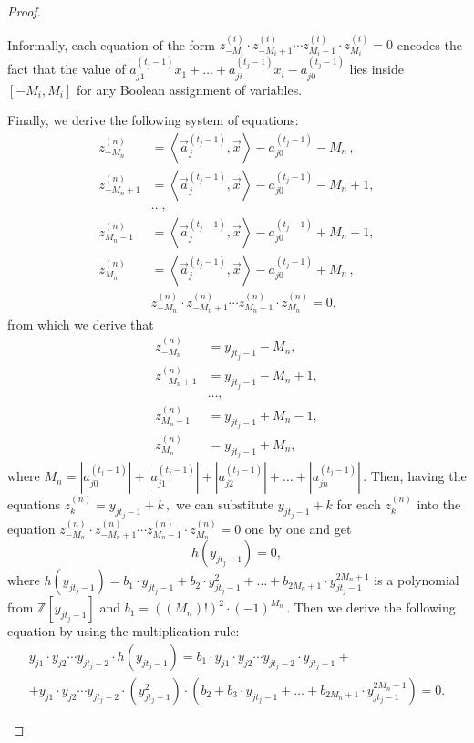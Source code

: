 \documentclass[11pt]{article}
\newcommand{\Z}{{\mathbb Z}}
\begin{document}
\begin{proof}
\begin{itemize}
Informally, each equation of the form $z_{-M_i}^{(i)} \cdot z_{-M_i + 1}^{(i)}  \cdots z_{M_i - 1}^{(i)} \cdot z_{M_i}^{(i)} = 0$ encodes the fact that the value of $a_{j 1}^{(t_j - 1)}x_1  + \ldots + a_{j i}^{(t_j - 1)}x_i - a_{j 0}^{(t_j - 1)}$ lies inside $[-M_i, M_i]$ for any Boolean assignment of variables.

Finally, we derive the following system of equations:
\begin{align*}
%
%
z_{-M_n}^{(n)} &= \left\langle \vec a_j^{(t_j - 1)}, \vec x \right \rangle - a_{j 0}^{(t_j - 1)} - M_n\,, \\
z_{-M_n + 1}^{(n)} &=\left\langle \vec a_j^{(t_j - 1)}, \vec x \right \rangle - a_{j 0}^{(t_j - 1)} - M_n + 1, \\
&\ldots, \\
z_{M_n - 1}^{(n)} &= \left\langle \vec a_j^{(t_j - 1)}, \vec x \right \rangle - a_{j 0}^{(t_j - 1)} + M_n - 1, \\
z_{M_n}^{(n)} &= \left\langle \vec a_j^{(t_j - 1)}, \vec x \right \rangle - a_{j 0}^{(t_j - 1)} + M_n\,, \\
&z_{-M_n}^{(n)} \cdot z_{-M_n + 1}^{(n)}  \cdots z_{M_n - 1}^{(n)} \cdot z_{M_n}^{(n)} = 0,
\end{align*}
from which we derive that
\begin{align*}
%
z_{-M_n}^{(n)} &= y_{j t_j - 1} - M_n, \\  z_{-M_n + 1}^{(n)} &= y_{j t_j - 1} - M_n + 1,  \\ &\ldots, \\ z_{M_n - 1}^{(n)} &= y_{j t_j - 1} + M_n - 1, \\ z_{M_n}^{(n)} &=  y_{j t_j - 1} + M_n, %
\end{align*}
%
where %
$M_n = |a_{j 0}^{(t_j - 1)}| + |a_{j 1}^{(t_j - 1)}| + |a_{j 2}^{(t_j - 1)}| + \ldots + |a_{j n}^{(t_j - 1)}|\,.$ %
 Then, having the equations %
$z_{k}^{(n)} = y_{j t_j - 1} + k\,,$ %
 we can substitute $y_{j t_j - 1} + k$ for each $z_{k}^{(n)}$ into the equation $z_{-M_n}^{(n)} \cdot z_{-M_n + 1}^{(n)}  \cdots z_{M_n - 1}^{(n)} \cdot z_{M_n}^{(n)} = 0$ one by one and get %
    $$
    h(y_{j t_j - 1}) = 0, %
    $$
    where $h(y_{j t_j - 1}) = b_1 \cdot y_{j t_j - 1} + b_2 \cdot y_{j t_j - 1}^2 + \ldots +  b_{2 M_n + 1} \cdot y_{j t_j - 1}^{2 M_n + 1} $ is a polynomial from $\Z[y_{j t_j - 1}]$ and %
$b_1 = ((M_n)!)^2 \cdot (-1)^{M_n}\,.$ %
 Then we derive the following equation by using the multiplication rule: %
    \begin{multline*}
      y_{j 1} \cdot y_{j 2} \cdots y_{j t_j - 2} \cdot h(y_{j t_j - 1}) = b_1 \cdot y_{j 1} \cdot y_{j 2} \cdots y_{j t_j - 2} \cdot y_{j t_j - 1} + \\ + y_{j 1} \cdot y_{j 2} \cdots y_{j t_j - 2} \cdot (y_{j t_j - 1}^2) \cdot (b_2 + b_3 \cdot y_{j t_j - 1} + \ldots +  b_{2 M_n + 1} \cdot y_{j t_j - 1}^{2 M_n - 1}) =  0. %

\end{multline*}
\end{itemize}
\end{proof}
\end{document}
